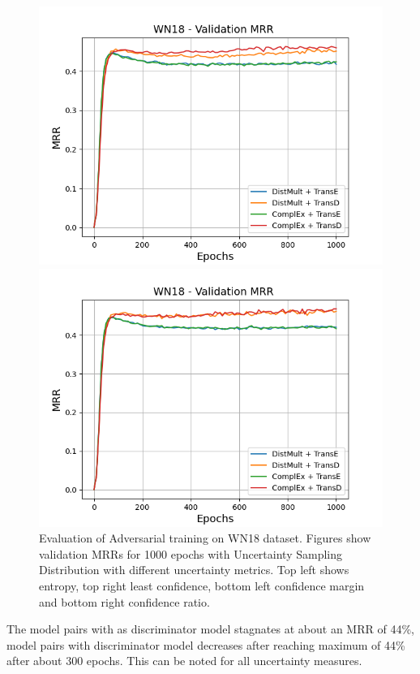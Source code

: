 \begin{figure}[H]
\begin{minipage}{.5\textwidth}
    \end{minipage}
    \begin{minipage}{.5\textwidth}
      \centering
      \includegraphics[width=0.9\linewidth]{figures/results/gan_train/not_pretrained/uncertainty/max_distribution/confidence_margin/wn18/uncertainty_wn18_mrrs.png}
    \end{minipage}%
    \begin{minipage}{.5\textwidth}
      \centering
      \includegraphics[width=0.9\linewidth]{figures/results/gan_train/not_pretrained/uncertainty/max_distribution/confidence_ratio/wn18/uncertainty_wn18_mrrs.png}
    \end{minipage}%
    \caption{Evaluation of Adversarial training on \textsc{WN18} dataset. 
    Figures show validation MRRs for 1000 epochs with Uncertainty Sampling Distribution with different uncertainty metrics.
    Top left shows entropy, top right least confidence, 
    bottom left confidence margin and bottom right confidence ratio.}
    \label{fig:advtrain_measures_wn18}
\end{figure}
The model pairs with \transd as discriminator model stagnates at about an MRR of 44\%, model pairs with \transe  discriminator model decreases after reaching maximum of 44\% after about 300 epochs.
This can be noted for all uncertainty measures.

